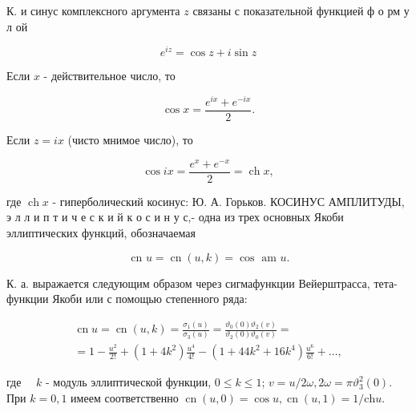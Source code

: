 \documentclass[10pt]{article}
\begin{document}
К. и синус комплексного аргумента $z$ связаны с показательной функцией ф о рм у л ой



\[

e^{i z}=\cos z+i \sin z

\]



Если $x$ - действительное число, то



\[

\cos x=\frac{e^{i x}+e^{-i x}}{2} .

\]



Если $z=i x$ (чисто мнимое число), то



\[

\cos i x=\frac{e^{x}+e^{-x}}{2}=\operatorname{ch} x,

\]



где $\operatorname{ch} x$ - гиперболический косинус: Ю. А. Горьков. КОСИНУС АМПЛИТУДЫ, э л л и п т и ч е с к и й к о с и н у с,- одна из трех основных Якоби эллиптических функций, обозначаемая



\[

\text { cn } u=\operatorname{cn}(u, k)=\cos \text { am } u .

\]



К. а. выражается следующим образом через сигмафункции Вейерштрасса, тета-функции Якоби или с помощью степенного ряда:



\[

\begin{gathered}

\operatorname{cn} u=\operatorname{cn}(u, k)=\frac{\sigma_{1}(u)}{\sigma_{3}(u)}=\frac{\vartheta_{0}(0) \vartheta_{2}(v)}{\vartheta_{2}(0) \vartheta_{0}(v)}= \\

=1-\frac{u^{2}}{2 !}+\left(1+4 k^{2}\right) \frac{u^{4}}{4 !}-\left(1+44 k^{2}+16 k^{4}\right) \frac{u^{6}}{6 !}+\ldots,

\end{gathered}

\]



где $\quad k$ - модуль эллиптической функции, $0 \leqslant k \leqslant 1$; $v=u / 2 \omega, 2 \omega=\pi \vartheta_{3}^{2}(0)$. При $k=0,1$ имеем соответственно $\operatorname{cn}(u, 0)=\cos u, \operatorname{cn}(u, 1)=1 / \mathrm{ch} u$.
\end{document}
